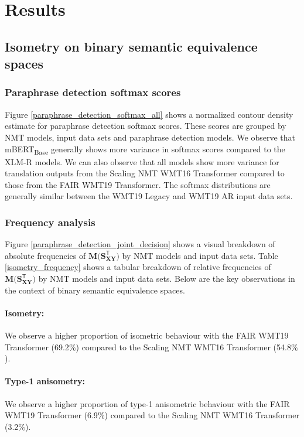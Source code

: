 \documentclass[11pt,a4paper]{article}
\begin{document}
\section{Results}

\subsection{Isometry on binary semantic equivalence spaces}

\subsubsection{Paraphrase detection softmax scores}

Figure \ref{paraphrase_detection_softmax_all} shows a normalized contour density estimate for paraphrase detection softmax scores. These scores are grouped by NMT models, input data sets and paraphrase detection models. We observe that mBERT\textsubscript{Base} generally shows more variance in softmax scores compared to the XLM-R models. We can also observe that all models show more variance for translation outputs from the Scaling NMT WMT16 Transformer compared to those from the FAIR WMT19 Transformer. The softmax distributions are generally similar between the WMT19 Legacy and WMT19 AR input data sets.

\subsubsection{Frequency analysis}

Figure \ref{paraphrase_detection_joint_decision} shows a visual breakdown of absolute frequencies of $\mathbf{M(S_{XY}^{\mathsf{T}}})$ by NMT models and input data sets. Table \ref{isometry_frequency} shows a tabular breakdown of relative frequencies of $\mathbf{M(S_{XY}^{\mathsf{T}}})$ by NMT models and input data sets. Below are the key observations in the context of binary semantic equivalence spaces.

\paragraph{Isometry:} We observe a higher proportion of isometric behaviour with the FAIR WMT19 Transformer (69.2$\%$) compared to the Scaling NMT WMT16 Transformer (54.8$\%$).
\paragraph{Type-1 anisometry:} We observe a higher proportion of type-1 anisometric behaviour with the FAIR WMT19 Transformer (6.9$\%$) compared to the Scaling NMT WMT16 Transformer (3.2$\%$).
\end{document}
